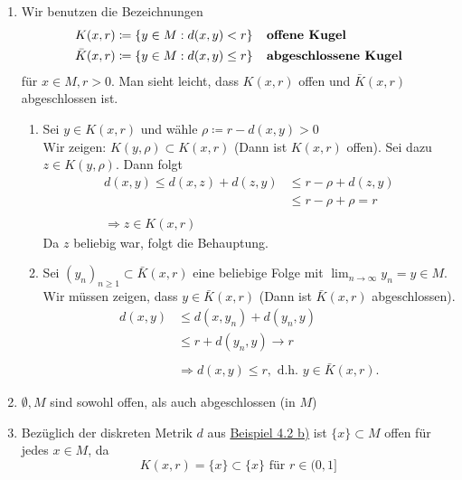 \begin{bemerkung} \label{bem:4.5}
	\begin{enumerate}[label=\alph*\upshape)] 
		\item Wir benutzen die Bezeichnungen
			\begin{align*}
				K(x, r) & \coloneqq \{ y \in M: d(x, y) < r \} \hspace{0.25cm} \text{\textbf{ offene Kugel}} \\
				\bar K(x, r) & \coloneqq \{ y \in M: d(x, y) \leq r \} \hspace{0.25cm}  \text{\textbf{ abgeschlossene Kugel}}
			\end{align*}
			für $x \in M, r > 0$. Man sieht leicht, dass $K(x, r)$ offen und $\bar K(x, r)$ abgeschlossen ist.
		\begin{beweis}
			\begin{enumerate}
			\item Sei $y \in K(x, r)$ und wähle $\rho \coloneqq r - d(x, y) > 0$ \\
				Wir zeigen: $K(y, \rho) \subset K(x, r)$ (Dann ist $K(x, r)$ offen). Sei dazu $z \in K(y, \rho)$. Dann folgt 
				\begin{align*}
					d(x, y) \leq d(x, z) + d(z,y) & \leq r - \rho + d(z, y) \\
												  & \leq r - \rho + \rho = r \\ \\
								\Rightarrow z \in K(x, r)
				\end{align*} 
				Da $z$ beliebig war, folgt die Behauptung.
			\item Sei $(y_{n})_{n \geq 1} \subset \bar K(x, r)$ eine beliebige Folge mit $ \lim_{n \rightarrow \infty} y_{n} = y \in M$. Wir müssen zeigen, dass $y \in \bar K(x, r)$ (Dann ist $\bar K(x, r)$ abgeschlossen). \\
				\begin{align*}
					d(x, y) & \leq d(x, y_{n}) + d(y_{n}, y) \\
							& \leq r + d(y_{n}, y) \rightarrow r \\ \\
						& \Rightarrow d(x, y) \leq r, \text{ d.h. } y \in \bar K(x, r).
				\end{align*} 
			\end{enumerate}	
		\end{beweis} 
		\item $\emptyset, M$ sind sowohl offen, als auch abgeschlossen (in $M$)
		\item Bezüglich der diskreten Metrik $d$ aus \hyperref[bsp:1-diskreteMetrik]{Beispiel 4.2 b)} ist $\{x\} \subset M$ offen für jedes $x \in M$, da
			\[ K(x, r) = \{ x \} \subset \{ x \} \text{ für } r \in (0, 1] \]
	\end{enumerate}	
\end{bemerkung}


